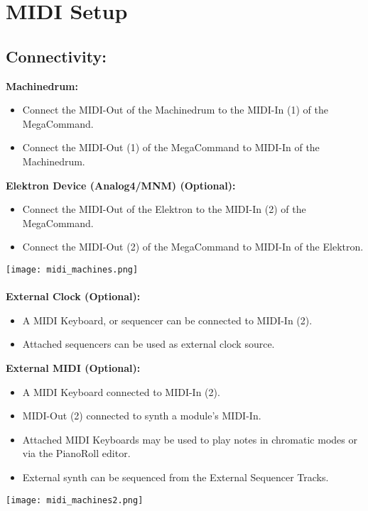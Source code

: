 \chapter{MIDI Setup}
\section{Connectivity:}
\textbf{Machinedrum:}
\begin{itemize}
    \item Connect the MIDI-Out of the Machinedrum to the MIDI-In (1) of the MegaCommand.
    \item Connect the MIDI-Out (1) of the MegaCommand to MIDI-In of the Machinedrum.
\end{itemize}

\textbf{Elektron Device (Analog4/MNM) (Optional):}
\begin{itemize}
    \item Connect the MIDI-Out of the Elektron to the MIDI-In (2) of the MegaCommand. 
    \item Connect the MIDI-Out (2) of the MegaCommand to MIDI-In of the Elektron.
\end{itemize}
\texttt{[image: midi\_machines.png]}\\
\\
\textbf{External Clock (Optional):} 

\begin{itemize}
    \item A MIDI Keyboard, or sequencer can be connected to MIDI-In (2). 
    \item Attached sequencers can be used as external clock source.
\end{itemize}

\textbf{External MIDI (Optional):}

\begin{itemize}
    \item A MIDI Keyboard connected to MIDI-In (2). 
    \item MIDI-Out (2) connected to synth a module's MIDI-In.
    \item Attached MIDI Keyboards may be used to play notes in chromatic modes or via the PianoRoll editor.
    \item External synth can be sequenced from the External Sequencer Tracks.
\end{itemize}



\newpage

\texttt{[image: midi\_machines2.png]}\\
